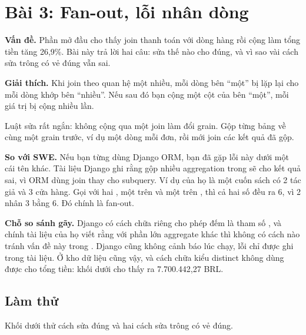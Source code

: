 \section{Bài 3: Fan-out, lỗi nhân dòng}

\textbf{Vấn đề.} Phần mở đầu cho thấy join thanh toán với dòng hàng rồi cộng làm tổng tiền tăng 26,9\%. Bài này trả lời hai câu: sửa thế nào cho đúng, và vì sao vài cách sửa trông có vẻ đúng vẫn sai.

\textbf{Giải thích.} Khi join theo quan hệ một nhiều, mỗi dòng bên ``một'' bị lặp lại cho mỗi dòng khớp bên ``nhiều''. Nếu sau đó bạn cộng một cột của bên ``một'', mỗi giá trị bị cộng nhiều lần.

Luật sửa rất ngắn: không cộng qua một join làm đổi grain. Gộp từng bảng về cùng một grain trước, ví dụ một dòng mỗi đơn, rồi mới join các kết quả đã gộp.

\begin{ghichu}
\textbf{So với SWE.} Nếu bạn từng dùng Django ORM, bạn đã gặp lỗi này dưới một cái tên khác. Tài liệu Django ghi rằng gộp nhiều aggregation trong  sẽ cho kết quả sai, vì ORM dùng join thay cho subquery. Ví dụ của họ là một cuốn sách có 2 tác giả và 3 cửa hàng. Gọi  với hai , một trên  và một trên , thì cả hai số đều ra 6, vì 2 nhân 3 bằng 6. Đó chính là fan-out.

\textbf{Chỗ so sánh gãy.} Django có cách chữa riêng cho phép đếm là tham số , và chính tài liệu của họ viết rằng với phần lớn aggregate khác thì không có cách nào tránh vấn đề này trong . Django cũng không cảnh báo lúc chạy, lỗi chỉ được ghi trong tài liệu. Ở kho dữ liệu cũng vậy, và cách chữa kiểu distinct không dùng được cho tổng tiền: khối dưới cho thấy  ra 7.700.442,27 BRL.
\end{ghichu}

\subsection{Làm thử}

Khối dưới thử cách sửa đúng và hai cách sửa trông có vẻ đúng.

